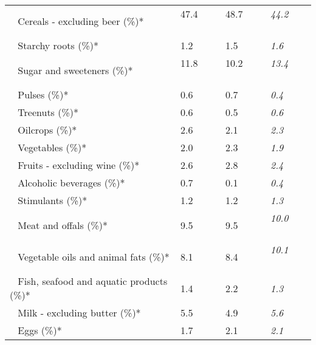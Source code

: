 \begin{tabular}{L{3.9cm} R{1cm} R{1cm} R{1cm}}
	 ~ Cereals - excluding beer (\%)* & 47.4 ~ \ \ & 48.7 ~ \ \ & \textit{44.2} ~ \ \ \\ 
	 ~ Starchy roots (\%)* & 1.2 ~ \ \ & 1.5 ~ \ \ & \textit{1.6} ~ \ \ \\ 
	 ~ Sugar and sweeteners (\%)* & 11.8 ~ \ \ & 10.2 ~ \ \ & \textit{13.4} ~ \ \ \\ 
	 ~ Pulses (\%)* & 0.6 ~ \ \ & 0.7 ~ \ \ & \textit{0.4} ~ \ \ \\ 
	 ~ Treenuts (\%)* & 0.6 ~ \ \ & 0.5 ~ \ \ & \textit{0.6} ~ \ \ \\ 
	 ~ Oilcrops (\%)* & 2.6 ~ \ \ & 2.1 ~ \ \ & \textit{2.3} ~ \ \ \\ 
	 ~ Vegetables (\%)* & 2.0 ~ \ \ & 2.3 ~ \ \ & \textit{1.9} ~ \ \ \\ 
	 ~ Fruits - excluding wine (\%)* & 2.6 ~ \ \ & 2.8 ~ \ \ & \textit{2.4} ~ \ \ \\ 
	 ~ Alcoholic beverages (\%)* & 0.7 ~ \ \ & 0.1 ~ \ \ & \textit{0.4} ~ \ \ \\ 
	 ~ Stimulants (\%)* & 1.2 ~ \ \ & 1.2 ~ \ \ & \textit{1.3} ~ \ \ \\ 
	 ~ Meat and offals (\%)* & 9.5 ~ \ \ & 9.5 ~ \ \ & \textit{10.0} ~ \ \ \\ 
	 ~ Vegetable oils and animal fats (\%)* & 8.1 ~ \ \ & 8.4 ~ \ \ & \textit{10.1} ~ \ \ \\ 
	 ~ Fish, seafood and aquatic products (\%)* & 1.4 ~ \ \ & 2.2 ~ \ \ & \textit{1.3} ~ \ \ \\ 
	 ~ Milk - excluding butter (\%)* & 5.5 ~ \ \ & 4.9 ~ \ \ & \textit{5.6} ~ \ \ \\ 
	 ~ Eggs (\%)* & 1.7 ~ \ \ & 2.1 ~ \ \ & \textit{2.1} ~ \ \ \\ 
       \toprule
      \end{tabular}
      \clearpage
{}

